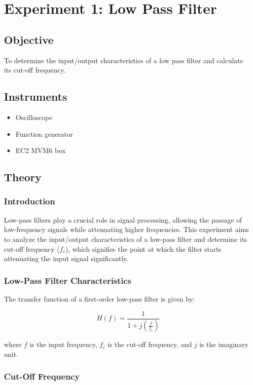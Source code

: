\newpage
\section{Experiment 1: Low Pass Filter}

\subsection{Objective}
To determine the input/output characteristics of a low pass filter and calculate its cut-off frequency.

\subsection{Instruments}
\begin{itemize}
\item Oscilloscope
\item Function generator
\item EC2 MVM6 box
\end{itemize}

\subsection{Theory}
\subsubsection{Introduction}

Low-pass filters play a crucial role in signal processing, allowing the passage of low-frequency signals while attenuating higher frequencies. This experiment aims to analyze the input/output characteristics of a low-pass filter and determine its cut-off frequency (\(f_c\)), which signifies the point at which the filter starts attenuating the input signal significantly.

\subsubsection{Low-Pass Filter Characteristics}

The transfer function of a first-order low-pass filter is given by:

\[
H(f) = \frac{1}{1 + j\left(\frac{f}{f_c}\right)}
\]

where \(f\) is the input frequency, \(f_c\) is the cut-off frequency, and \(j\) is the imaginary unit.

\subsubsection{Cut-Off Frequency}

